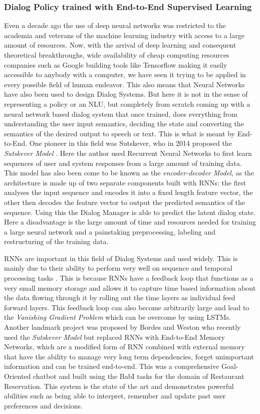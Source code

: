 \documentclass[14pt]{extarticle}
\numberwithin{equation}{section}
\begin{document}
	\subsubsection{Dialog Policy trained with End-to-End Supervised Learning}
	Even a decade ago the use of deep neural networks was restricted to the academia and veterans of the machine learning industry with access to a large amount of resources. Now, with the arrival of deep learning and consequent theoretical breakthroughs, wide availability of cheap computing resources companies such as Google building tools like Tensorflow\cite{tensorflow} making it easily accessible to anybody with a computer, we have seen it trying to be applied in every possible field of human endeavor. This also means that Neural Networks have also been used to design Dialog Systems. But here it is not in the sense of representing a policy or an NLU, but completely from scratch coming up with a neural network based dialog system that once trained, does everything from understanding the user input semantics, deciding the state and converting the semantics of the desired output to speech or text. This is what is meant by End-to-End. One pioneer in this field was Sutskever, who in 2014 proposed the \textit{Sutskever Model} \cite{Sutskever_seq_2seq}. Here the author used Recurrent Neural Networks to first learn sequences of user and system responses from a large amount of training data. This model has also been come to be known as the \textit{encoder-decoder Model}, as the architecture is made up of two separate components built with RNNs: the first analyses the input sequence and encodes it into a fixed length feature vector, the other then decodes the feature vector to output the predicted semantics of the sequence. Using this the Dialog Manager is able to predict the latent dialog state. Here a disadvantage is the large amount of time and resources needed for training a large neural network and a painstaking preprocessing, labeling and restructuring of the training data.
	
	RNNs are important in this field of Dialog Systems and used widely. This is mainly due to their ability to perform very well on sequence and temporal processing tasks \cite{karpathy_rnn}. This is because RNNs have a feedback loop that functions as a very small memory storage and allows it to capture time based information about the data flowing through it by rolling out the time layers as individual feed forward layers. This feedback loop can also become arbitrarily large and lead to the \textit{Vanishing Gradient Problem}\cite{hochreiter1998vanishing} which can be overcome by using LSTMs\cite{hochreiter1997long}. Another landmark project was proposed by Bordes and Weston who recently used the \textit{Sutskever Model} but replaced RNNs with End-to-End Memory Networks\cite{Sukhbaatar_end2end_mem_net}, which are a modified form of RNN combined with external memory that have the ability to manage very long term dependencies, forget unimportant information and can be trained end-to-end. This was a comprehensive Goal-Oriented chatbot and built using the BabI tasks\cite{babl} for the domain of Restaurant Reservation\cite{bordes_weston_e2e}. This system is the state of the art and demonstrates powerful abilities such as being able to interpret, remember and update past user preferences and decisions.
\end{document}

